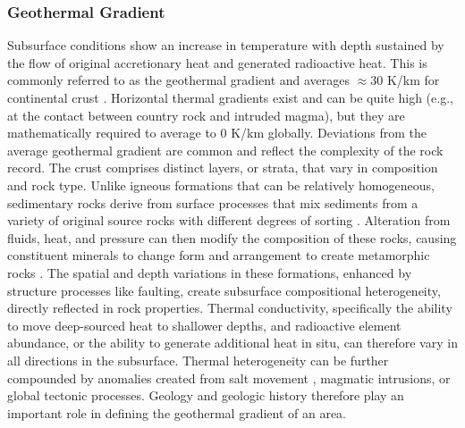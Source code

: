 \subsubsection{Geothermal Gradient}\label{ch2:geotherm}

Subsurface conditions show an increase in temperature with depth sustained by the flow of original accretionary heat and generated radioactive heat. This is commonly referred to as the geothermal gradient and averages $\approx30$ K/km for continental crust \citep[p.\ 209]{press_understanding_2004}. Horizontal thermal gradients exist and can be quite high (e.g., at the contact between country rock and intruded magma), but they are mathematically required to average to 0 K/km globally. Deviations from the average geothermal gradient are common and reflect the complexity of the rock record. The crust comprises distinct layers, or strata, that vary in composition and rock type. Unlike igneous formations that can be relatively homogeneous, sedimentary rocks derive from surface processes that mix sediments from a variety of original source rocks with different degrees of sorting \citep[p.\ 164--168]{press_understanding_2004}. Alteration from fluids, heat, and pressure can then modify the composition of these rocks, causing constituent minerals to change form and arrangement to create metamorphic rocks \citep[p.\ 195--205]{press_understanding_2004}. The spatial and depth variations in these formations, enhanced by structure processes like faulting, create subsurface compositional heterogeneity, directly reflected in rock properties. Thermal conductivity, specifically the ability to move deep-sourced heat to shallower depths, and radioactive element abundance, or the ability to generate additional heat in situ, can therefore vary in all directions in the subsurface. Thermal heterogeneity can be further compounded by anomalies created from salt movement \citep[p.\ 164--168]{press_understanding_2004}, magmatic intrusions, or global tectonic processes. Geology and geologic history therefore play an important role in defining the geothermal gradient of an area.

